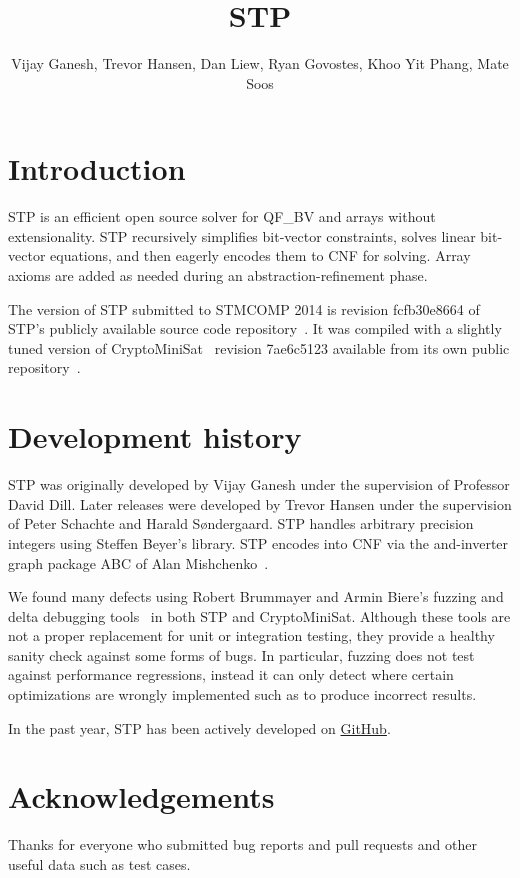 \documentclass{llncs}
\begin{document}
\title{STP}
\author{Vijay Ganesh, Trevor Hansen, Dan Liew, Ryan Govostes, Khoo Yit Phang, Mate Soos}
\institute{}

\maketitle
\thispagestyle{empty}
\pagestyle{empty}

\section{Introduction}
STP\cite{Vijay:Thesis:2007} is an efficient open source solver for QF\_BV and arrays without extensionality. STP
recursively simplifies bit-vector constraints, solves linear bit-vector equations, and then eagerly encodes them to CNF
for solving. Array axioms are added as needed during an abstraction-refinement phase.

The version of STP submitted to STMCOMP 2014 is revision fcfb30e8664 of STP's publicly available source code
repository~\cite{STP:github}. It was compiled with a slightly tuned version of
CryptoMiniSat~\cite{DBLP:conf/sat/SoosNC09} revision 7ae6c5123 available from its own public
repository~\cite{CMS:github}.


\section{Development history}
STP was originally developed by Vijay Ganesh under the supervision of Professor David Dill. Later releases were
developed by Trevor Hansen under the supervision of Peter Schachte and Harald Søndergaard. STP handles arbitrary
precision integers using Steffen Beyer's library. STP encodes into CNF via the and-inverter graph package ABC of Alan
Mishchenko~\cite{Brayton:2010:AAI:2144310.2144317}.

We found many defects using Robert Brummayer and Armin Biere's
fuzzing and delta debugging tools~\cite{Brummayer:2009:FDS:1670412.1670413} in both STP and CryptoMiniSat. Although
these tools are not a proper replacement for unit or integration testing, they provide a healthy sanity check against
some forms of bugs. In particular, fuzzing does not test against performance regressions,
instead it can only detect where certain optimizations are wrongly implemented such as to produce incorrect results.

In the past year, STP has been actively developed on \href{https://github.com/stp/stp}{GitHub}.

\section*{Acknowledgements}
Thanks for everyone who submitted bug reports and pull requests and other useful data such as test cases.




\vfill
\pagebreak
\end{document}
